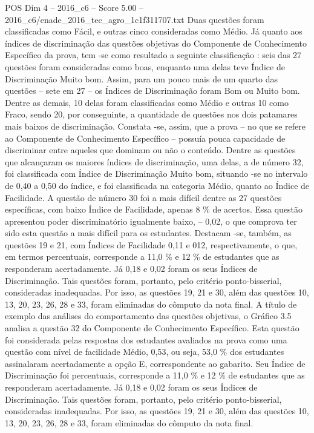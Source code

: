 \begin{textsample}{POS Dim 4 – 2016\_c6 – Score 5.00 – 2016\_c6/enade\_2016\_tec\_agro\_1c1f311707.txt}
Duas questões foram classificadas como Fácil, e outras cinco consideradas como Médio.
Já quanto aos índices de discriminação das questões objetivas do Componente de Conhecimento Específico da prova, tem -se como resultado a seguinte classificação : seis das 27 questões foram consideradas como boas, enquanto uma delas teve Índice de Discriminação Muito bom.
Assim, para um pouco mais de um quarto das questões – sete em 27 – os Índices de Discriminação foram Bom ou Muito bom.
Dentre as demais, 10 delas foram classificadas como Médio e outras 10 como Fraco, sendo 20, por conseguinte, a quantidade de questões nos dois patamares mais baixos de discriminação.
Constata -se, assim, que a prova – no que se refere ao Componente de Conhecimento Específico – possuía pouca capacidade de discriminar entre aqueles que dominam ou não o conteúdo.
Dentre as questões que alcançaram os maiores índices de discriminação, uma delas, a de número 32, foi classificada com Índice de Discriminação Muito bom, situando -se no intervalo de 0,40 a 0,50 do índice, e foi classificada na categoria Médio, quanto ao Índice de Facilidade.
A questão de número 30 foi a mais difícil dentre as 27 questões específicas, com baixo Índice de Facilidade, apenas 8 \% de acertos.
Essa questão apresentou poder discriminatório igualmente baixo, – 0,02, o que comprova ter sido esta questão a mais difícil para os estudantes.
Destacam -se, também, as questões 19 e 21, com Índices de Facilidade 0,11 e 012, respectivamente, o que, em termos percentuais, corresponde a 11,0 \% e 12 \% de estudantes que as responderam acertadamente.
Já 0,18 e 0,02 foram os seus Índices de Discriminação.
Tais questões foram, portanto, pelo critério ponto-bisserial, consideradas inadequadas.
Por isso, as questões 19, 21 e 30, além das questões 10, 13, 20, 23, 26, 28 e 33, foram eliminadas do cômputo da nota final.
A título de exemplo das análises do comportamento das questões objetivas, o Gráfico 3.5 analisa a questão 32 do Componente de Conhecimento Específico.
Esta questão foi considerada pelas respostas dos estudantes avaliados na prova como uma questão com nível de facilidade Médio, 0,53, ou seja, 53,0 \% dos estudantes assinalaram acertadamente a opção E, correspondente ao gabarito.
Seu Índice de Discriminação foi percentuais, corresponde a 11,0 \% e 12 \% de estudantes que as responderam acertadamente.
Já 0,18 e 0,02 foram os seus Índices de Discriminação.
Tais questões foram, portanto, pelo critério ponto-bisserial, consideradas inadequadas.
Por isso, as questões 19, 21 e 30, além das questões 10, 13, 20, 23, 26, 28 e 33, foram eliminadas do cômputo da nota final.

\end{textsample}
